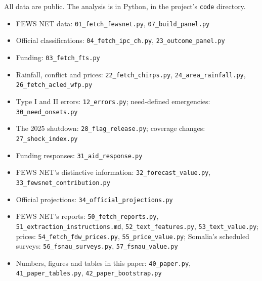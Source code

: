 \documentclass[11pt]{article}
\begin{document}
\begin{appendices}
All data are public. The analysis is in Python, in the project's \texttt{code} directory.
\begingroup\sloppy\small
\begin{itemize}
  \item FEWS NET data: \texttt{01\_fetch\_fewsnet.py}, \texttt{07\_build\_panel.py}
  \item Official classifications: \texttt{04\_fetch\_ipc\_ch.py}, \texttt{23\_outcome\_panel.py}
  \item Funding: \texttt{03\_fetch\_fts.py}
  \item Rainfall, conflict and prices: \texttt{22\_fetch\_chirps.py}, \texttt{24\_area\_rainfall.py}, \texttt{26\_fetch\_acled\_wfp.py}
  \item Type I and II errors: \texttt{12\_errors.py}; need-defined emergencies: \texttt{30\_need\_onsets.py}
  \item The 2025 shutdown: \texttt{28\_flag\_release.py}; coverage changes: \texttt{27\_shock\_index.py}
  \item Funding responses: \texttt{31\_aid\_response.py}
  \item FEWS NET's distinctive information: \texttt{32\_forecast\_value.py}, \texttt{33\_fewsnet\_contribution.py}
  \item Official projections: \texttt{34\_official\_projections.py}
  \item FEWS NET's reports: \texttt{50\_fetch\_reports.py}, \texttt{51\_extraction\_instructions.md}, \texttt{52\_text\_features.py}, \texttt{53\_text\_value.py}; prices: \texttt{54\_fetch\_fdw\_prices.py}, \texttt{55\_price\_value.py}; Somalia's scheduled surveys: \texttt{56\_fsnau\_surveys.py}, \texttt{57\_fsnau\_value.py}
  \item Numbers, figures and tables in this paper: \texttt{40\_paper.py}, \texttt{41\_paper\_tables.py}, \texttt{42\_paper\_bootstrap.py}
\end{itemize}
\endgroup

\end{appendices}
\end{document}
